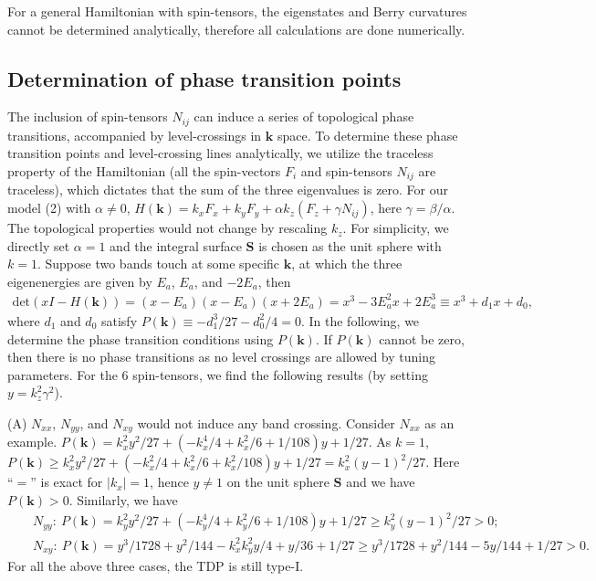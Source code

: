\documentclass[aps,prl,floatfix,twocolumn,reprint]{revtex4}
\begin{document}
For a general Hamiltonian with spin-tensors, the eigenstates and Berry
curvatures cannot be determined analytically, therefore all calculations are
done numerically.

\subsection{Determination of phase transition points}

The inclusion of spin-tensors $N_{ij}$ can induce a series of topological
phase transitions, accompanied by level-crossings in $\bm k$ space. To
determine these phase transition points and level-crossing lines
analytically, we utilize the traceless property of the Hamiltonian (all the
spin-vectors $F_i$ and spin-tensors $N_{ij}$ are traceless), which dictates that
the sum of the three eigenvalues is zero. For our model (2) with $\alpha\neq
0$, $H(\bm k)=k_x F_x +k_y F_y+\alpha k_z(F_z+\gamma N_{ij})$, here $%
\gamma=\beta/\alpha$. The topological properties would not change by
rescaling $k_z$. For simplicity, we directly set $\alpha=1$ and the integral
surface $\bm{S}$ is chosen as the unit sphere with $k=1$. Suppose two
bands touch at some specific $\bm{k}$, at which the three eigenenergies are given by $E_a$, $E_a$, and $-2E_a$, then
\begin{eqnarray}
\text{det}(xI-H(\bm k))=(x-E_a)(x-E_a)(x+2E_a)=x^3-3E_a^2x+2E_a^3\equiv x^3+d_1x+d_0,
\end{eqnarray}
where $d_1$ and $d_0$ satisfy $P(\bm k)\equiv -d_1^3/27-d_0^2/4=0$. In the following, we determine the phase transition conditions using $P(\mathbf{k})$. If $P(\mathbf{k})$ cannot be zero, then there is no phase transitions as no level crossings are allowed by tuning parameters. For the $%
6$ spin-tensors, we find the following results (by setting $y= k_z^2\gamma^2$).

(A) $N_{xx}$, $N_{yy}$, and $N_{xy}$ would not induce any band crossing. Consider $N_{xx}$ as an example. 
$P(\bm k)=k_x^2y^2/27+(-k_x^4/4+k_x^2/6+1/108)y+1/27$. As $k=1$, $P(\mathbf{k})\geq k_x^2y^2/27+(-k_x^2/4+k_x^2/6+k_x^2/108)y+1/27=k_x^2(y-1)^2/27$. Here ``$=$'' is exact for $|k_x|=1$, hence $y\neq 1$ on the unit sphere $\bm{S}$ and we have $P(\mathbf{k})>0$. Similarly, we have
\begin{eqnarray*}
&&N_{yy}:~P(\bm k)=k_y^2y^2/27+(-k_y^4/4+k_y^2/6+1/108)y+1/27\geq
k_y^2(y-1)^2/27>0; \\
&&N_{xy}:~P(\bm k)=y^3/1728+y^2/144-k_x^2k_y^2 y/4+y/36+1/27\geq
y^3/1728+y^2/144-5y/144+1/27> 0.
\end{eqnarray*}
For all the above three cases, the TDP is still type-I.
\end{document}
